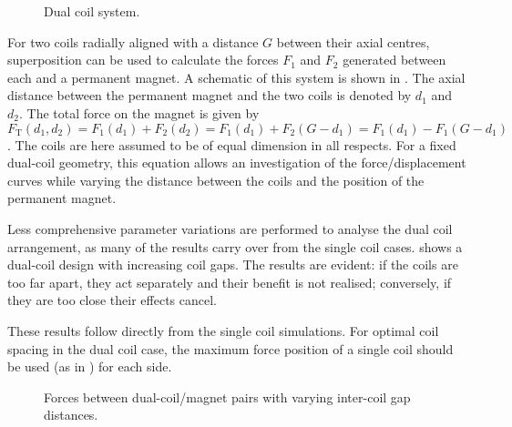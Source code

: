 \begin{figure}
  \caption{Dual coil system.}
\end{figure}

For two coils radially aligned with a distance $G$ between their axial
centres, superposition can be used to calculate the forces $F_1$ and
$F_2$ generated between each and a permanent magnet. A schematic of this
system is shown in . The axial
distance between the permanent magnet and the two coils is denoted by
$d_1$ and $d_2$. The total force on the magnet is given by
\begin{dmath}
F_{\mathrm{T}}(d_1,d_2)
  =F_1(d_1)+F_2(d_2)
  =F_1(d_1)+F_2(G-d_1)
  =F_1(d_1)-F_1(G-d_1)
\end{dmath}.
The coils are here assumed to be of equal dimension in all
respects. For a fixed dual-coil geometry, this equation allows an
investigation of the force/\-displacement curves while varying the
distance between the coils and the position of the permanent magnet.

Less comprehensive parameter variations are performed to analyse the dual coil
arrangement, as many of the results carry over from the single coil
cases.  shows a dual-coil design with increasing coil
gaps. The results are evident: if the coils are too far apart, they
act separately and their benefit is not realised; conversely, if they
are too close their effects cancel.


These results follow directly from the single coil simulations. For
optimal coil spacing in the dual coil case, the maximum force position
of a single coil should be used (as in ) for each
side. 

\begin{figure}
  \begin{subfigure}
  \end{subfigure}\par
  \begin{subfigure}
  \end{subfigure}
  \caption{Forces between dual-coil/magnet pairs with varying
    inter-coil gap distances. }
\end{figure}

